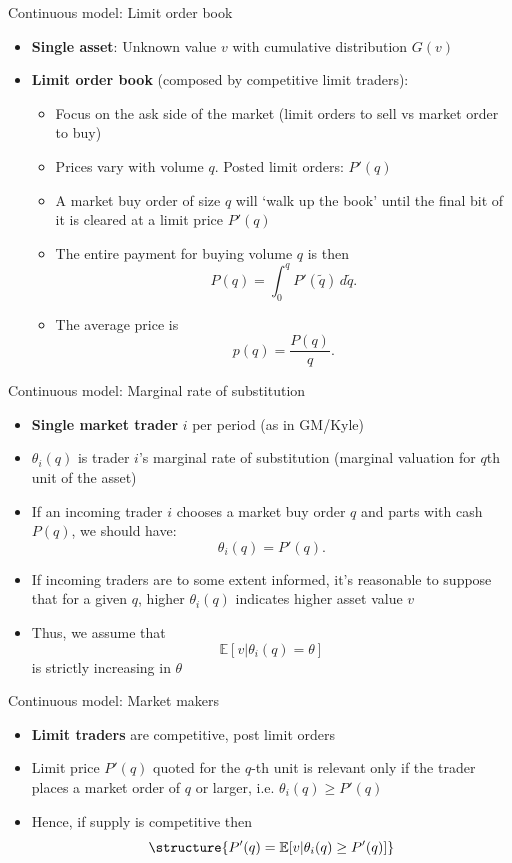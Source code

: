 \documentclass[english,10pt
,aspectratio=169
]{beamer}
\begin{document}
\begin{frame}{Continuous model: Limit order book}
\begin{itemize}
	\item \textbf{Single asset}: Unknown value $v$ with cumulative distribution  $G(v)$
	\item \textbf{Limit order book} (composed by competitive limit traders): 
	\begin{itemize}
		\item Focus on the ask side of the market (limit orders to sell vs market order to buy)
		\item Prices vary with volume $q$. Posted limit orders: $P'(q)$
		\item A market buy order of size $q$ will `walk up the book' until the final bit of it is cleared at a limit price $P'(q)$
		\item The entire payment for buying volume $q$ is then
		\[
		P(q) = \int_0^q P'(\tilde{q}) \, d\tilde{q}.
		\]
		\item The average price is 
		\[
		p(q) = \frac{P(q)}{q}.
		\]
	\end{itemize}
\end{itemize}
\end{frame}


\begin{frame}{Continuous model: Marginal rate of substitution}
	\begin{itemize}
		\item \textbf{Single market trader} $i$ per period (as in GM/Kyle)
		\item $\theta_i(q)$ is trader $i$'s marginal rate of substitution (marginal valuation for $q$th unit of the asset)
		\item If an incoming trader $i$ chooses a market buy order $q$ and parts with cash $P(q)$, we should have: \[\theta_i(q) = P'(q).\]
		\item If incoming traders are to some extent informed, it's reasonable to suppose that for a given $q$, higher $\theta_i(q)$ indicates higher asset value $v$
		\item Thus, we assume that 
		\[
		\mathbb{E}[v|\theta_i(q) = \theta]
		\]
		is strictly increasing in $\theta$
	\end{itemize}
\end{frame}


\begin{frame}{Continuous model: Market makers}
	\begin{itemize}	
		\item \textbf{Limit traders} are competitive, post limit orders
		\item Limit price $P'(q)$ quoted for the $q$-th unit is relevant only if the trader places a market order of $q$ or larger, i.e. $\theta_i(q) \geq P'(q)$
		\item Hence, if supply is competitive then
		\[
		\structure{P'(q) = \mathbb{E}[v|\theta_i(q) \geq P'(q)]}
		\]
	\end{itemize}
\end{frame}
\end{document}
